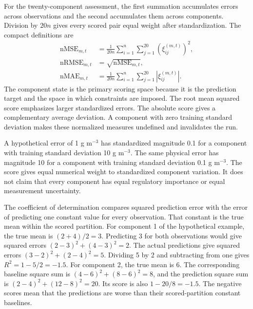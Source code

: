 For the twenty-component assessment, the first summation accumulates errors across observations and the second accumulates them across components. Division by $20n$ gives every scored pair equal weight after standardization. The compact definitions are
\begin{align}
\mathrm{nMSE}_{m,t}&=\frac{1}{20n}\sum_{i=1}^{n}\sum_{j=1}^{20}(\xi_{ij}^{(m,t)})^2,\label{eq:projection_nmse}\\
\mathrm{nRMSE}_{m,t}&=\sqrt{\mathrm{nMSE}_{m,t}},\label{eq:projection_nrmse}\\
\mathrm{nMAE}_{m,t}&=\frac{1}{20n}\sum_{i=1}^{n}\sum_{j=1}^{20}|\xi_{ij}^{(m,t)}|.
\label{eq:projection_nmae}
\end{align}
The component state is the primary scoring space because it is the prediction target and the space in which constraints are imposed. The root mean squared score emphasizes larger standardized errors. The absolute score gives a complementary average deviation. A component with zero training standard deviation makes these normalized measures undefined and invalidates the run.

A hypothetical error of 1 g m$^{-3}$ has standardized magnitude 0.1 for a component with training standard deviation 10 g m$^{-3}$. The same physical error has magnitude 10 for a component with training standard deviation 0.1 g m$^{-3}$. The score gives equal numerical weight to standardized component variation. It does not claim that every component has equal regulatory importance or equal measurement uncertainty.

The coefficient of determination compares squared prediction error with the error of predicting one constant value for every observation. That constant is the true mean within the scored partition. For component 1 of the hypothetical example, the true mean is $(2+4)/2=3$. Predicting 3 for both observations would give squared errors $(2-3)^2+(4-3)^2=2$. The actual predictions give squared errors $(3-2)^2+(2-4)^2=5$. Dividing 5 by 2 and subtracting from one gives $R^2=1-5/2=-1.5$. For component 2, the true mean is 6. The corresponding baseline square sum is $(4-6)^2+(8-6)^2=8$, and the prediction square sum is $(2-4)^2+(12-8)^2=20$. Its score is also $1-20/8=-1.5$. The negative scores mean that the predictions are worse than their scored-partition constant baselines.

